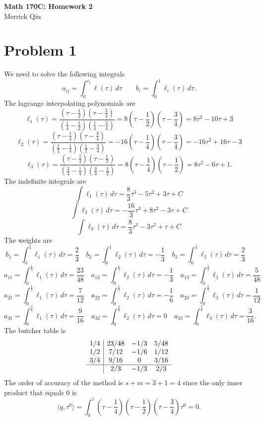 \documentclass{article}
\begin{document}
\begin{center}
	\huge{\bf Math 170C: Homework 2} \\
	Merrick Qiu
\end{center}

\section*{Problem 1}
We need to solve the following integrals
\[
	a_{ij} = \int_0^{c_i} \ell(\tau) \,d\tau \qquad b_i = \int_0^1 \ell_i(\tau) \,d\tau.
\]
The lagrange interpolating polynomials are
\[
	\ell_1(\tau) 
	= \frac{(\tau - \frac{1}{2})(\tau - \frac{3}{4})}{(\frac{1}{4} - \frac{1}{2})(\frac{1}{4} - \frac{3}{4})}
    = 8\left(\tau - \frac{1}{2}\right)\left(\tau - \frac{3}{4}\right)
	= 8\tau^2 -10\tau +3
\]
\[
	\ell_2(\tau) 
	= \frac{(\tau - \frac{1}{4})(\tau - \frac{3}{4})}{(\frac{1}{2} - \frac{1}{4})(\frac{1}{2} - \frac{3}{4})}
    = -16\left(\tau - \frac{1}{4}\right)\left(\tau - \frac{3}{4}\right)
	= -16\tau^2 + 16\tau - 3
\]
\[
	\ell_3(\tau)
	= \frac{(\tau - \frac{1}{4})(\tau - \frac{1}{2})}{(\frac{3}{4} - \frac{1}{4})(\frac{3}{4} - \frac{1}{2})}
    = 8\left(\tau - \frac{1}{4}\right)\left(\tau - \frac{1}{2}\right)
	= 8\tau^2 -6\tau +1.
\]
The indefinite integrals are 
\[
	\int \ell_1(\tau) \,d\tau = \frac{8}{3}\tau^3 -5\tau^2 + 3\tau + C
\]
\[
	\int \ell_2(\tau) \,d\tau = -\frac{16}{3}\tau^3 + 8\tau^2 - 3\tau + C
\]
\[
	\int \ell_3(\tau) \,d\tau = \frac{8}{3}\tau^3 -3\tau^2 + \tau + C
\]
The weights are 
\[
	b_1 = \int_0^1 \ell_1(\tau) \,d\tau = \frac{2}{3} \quad 
	b_2 = \int_0^1 \ell_2(\tau) \,d\tau = -\frac{1}{3} \quad
	b_3 = \int_0^1 \ell_3(\tau) \,d\tau = \frac{2}{3} \quad
\]
\[
	a_{11} = \int_0^{\frac{1}{4}} \ell_1(\tau) \,d\tau = \frac{23}{48}\quad 
	a_{12} = \int_0^{\frac{1}{4}} \ell_2(\tau) \,d\tau = -\frac{1}{3} \quad
	a_{13} = \int_0^{\frac{1}{4}} \ell_3(\tau) \,d\tau =  \frac{5}{48}\quad
\]
\[
	a_{21} = \int_0^{\frac{1}{2}} \ell_1(\tau) \,d\tau = \frac{7}{12} \quad 
	a_{22} = \int_0^{\frac{1}{2}} \ell_2(\tau) \,d\tau =  -\frac{1}{6} \quad
	a_{23} = \int_0^{\frac{1}{2}} \ell_3(\tau) \,d\tau =  \frac{1}{12} \quad
\]
\[
	a_{31} = \int_0^{\frac{3}{4}} \ell_1(\tau) \,d\tau = \frac{9}{16} \quad 
	a_{32} = \int_0^{\frac{3}{4}} \ell_2(\tau) \,d\tau =  0 \quad
	a_{33} = \int_0^{\frac{3}{4}} \ell_3(\tau) \,d\tau = \frac{3}{16}.
\]
The butcher table is
\[
	\begin{array}{c|ccc}
	1/4 &23/48 &-1/3 &5/48 \\
	1/2 &7/12 &-1/6 &1/12 \\
	3/4 &9/16 &0 &3/16 \\
	\hline
	&2/3  &-1/3  &2/3 \\
	\end{array}
\]
The order of accuracy of the method is $s+m = 3+1 = 4$ since the only inner product that equals 0 is
\[
	\langle q, \tau^0 \rangle = 
	\int_0^1 \left(\tau-\frac{1}{4}\right)\left(\tau-\frac{1}{2}\right)\left(\tau-\frac{3}{4}\right)\tau^0 = 0.
\]
\newpage 
\end{document}
